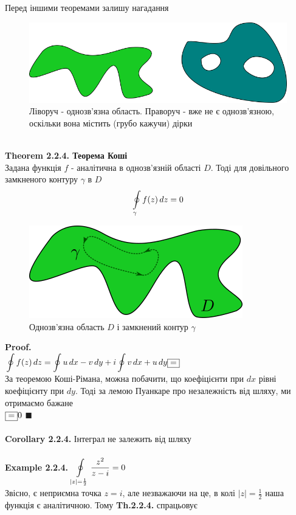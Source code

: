 \documentclass[a4paper, 14pt]{extarticle}
\def\hugespace{\vspace{5mm} \\}
\begin{document}
	Перед іншими теоремами залишу нагадання
	\begin{figure}[h]
	\captionsetup{justification=centering}
	\centerline{\includegraphics[scale = 0.5]{simply_connected.png}}
	\caption{Ліворуч - однозв'язна область. Праворуч - вже не є однозв'язною, оскільки вона містить (грубо кажучи) дірки}
	\end{figure}
	\hugespace
	
	\textbf{Theorem 2.2.4. Теорема Коші}\\
	Задана функція $f$ - аналітична в однозв'язній області $D$. Тоді для довільного замкненого контуру $\gamma$ в $D$
	\begin{align*}
	\oint\displaylimits_{\gamma} f(z)\,dz=0
	\end{align*}
	\begin{figure}[h]
	\centerline{\includegraphics[scale = 1]{g1026.png}}
	\caption{Однозв'язна область $D$ і замкнений контур $\gamma$}
	\end{figure}
	\textbf{Proof.}\\
	$\displaystyle\oint f(z)\,dz = \oint u\,dx-v\,dy + i\oint v\,dx+u\,dy \fbox{=}$\\
	За теоремою Коші-Рімана, можна побачити, що коефіцієнти при $dx$ рівні коефіцієнту при $dy$. Тоді за лемою Пуанкаре про незалежність від шляху, ми отримаємо бажане\\
	$\fbox{=} 0$  $\blacksquare$\\
	\hugespace
	\textbf{Corollary 2.2.4.} Інтеграл не залежить від шляху\\
	\hugespace
	\textbf{Example 2.2.4.} $\displaystyle \oint\displaylimits_{|z| = \frac{1}{2}} \frac{z^2}{z-i} = 0$\\
	Звісно, є неприємна точка $z = i$, але незважаючи на це, в колі $\displaystyle |z|=\frac{1}{2}$ наша функція є аналітичною. Тому \textbf{Th.2.2.4.} спрацьовує
	\hugespace
	
\end{document}
